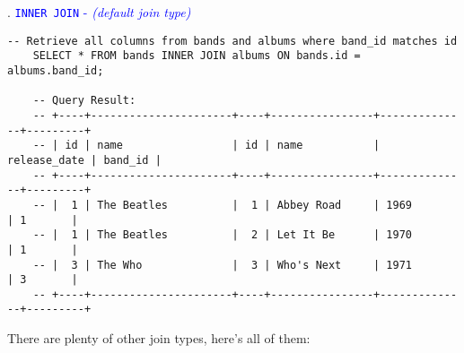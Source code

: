. \textcolor{blue}{\texttt{INNER JOIN} - \textit{(default join type)}}

\begin{lstlisting}[style=sql]
    -- Retrieve all columns from bands and albums where band_id matches id
    SELECT * FROM bands INNER JOIN albums ON bands.id = albums.band_id;

    -- Query Result:
    -- +----+----------------------+----+----------------+--------------+---------+
    -- | id | name                 | id | name           | release_date | band_id |
    -- +----+----------------------+----+----------------+--------------+---------+
    -- |  1 | The Beatles          |  1 | Abbey Road     | 1969         | 1       |
    -- |  1 | The Beatles          |  2 | Let It Be      | 1970         | 1       |
    -- |  3 | The Who              |  3 | Who's Next     | 1971         | 3       |
    -- +----+----------------------+----+----------------+--------------+---------+
\end{lstlisting}

\noindent
There are plenty of other join types, here's all of them:
\newpage
\begin{figure}[htbp]
    \centering
    \begin{minipage}[b]{0.45\textwidth}
        \centering
    \end{minipage}
    \hfill
    \begin{minipage}[b]{0.45\textwidth}
        \centering
    \end{minipage}
\end{figure}

